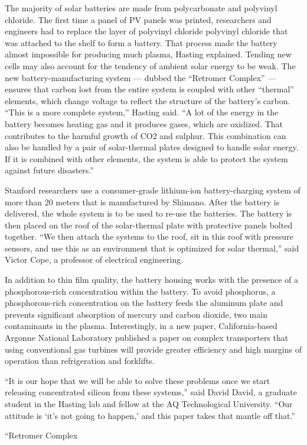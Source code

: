 \documentclass{article}
\begin{document}
The majority of solar batteries are made from polycarbonate and polyvinyl chloride. The first time a panel of PV panels was printed, researchers and engineers had to replace the layer of polyvinyl chloride polyvinyl chloride that was attached to the shelf to form a battery. That process made the battery almost impossible for producing much plasma, Hasting explained. Tending new cells may also account for the tendency of ambient solar energy to be weak. The new battery-manufacturing system — dubbed the “Retromer Complex” — ensures that carbon lost from the entire system is coupled with other “thermal” elements, which change voltage to reflect the structure of the battery’s carbon. “This is a more complete system,” Hasting said. “A lot of the energy in the battery becomes heating gas and it produces gases, which are oxidized. That contributes to the harmful growth of CO2 and sulphur. This combination can also be handled by a pair of solar-thermal plates designed to handle solar energy. If it is combined with other elements, the system is able to protect the system against future disasters.”

Stanford researchers use a consumer-grade lithium-ion battery-charging system of more than 20 meters that is manufactured by Shimano. After the battery is delivered, the whole system is to be used to re-use the batteries. The battery is then placed on the roof of the solar-thermal plate with protective panels bolted together. “We then attach the systems to the roof, sit in this roof with pressure sensors, and use this as an environment that is optimized for solar thermal,” said Victor Cope, a professor of electrical engineering.

In addition to thin film quality, the battery housing works with the presence of a phosphorous-rich concentration within the battery. To avoid phosphorus, a phosphorous-rich concentration on the battery feeds the aluminum plate and prevents significant absorption of mercury and carbon dioxide, two main contaminants in the plasma. Interestingly, in a new paper, California-based Argonne National Laboratory published a paper on complex transporters that using conventional gas turbines will provide greater efficiency and high margins of operation than refrigeration and forklifts.

“It is our hope that we will be able to solve these problems once we start releasing concentrated silicon from these systems,” said David David, a graduate student in the Hasting lab and fellow at the AQ Technological University. “Our attitude is ‘it’s not going to happen,’ and this paper takes that mantle off that.”

“Retromer Complex
\end{document}
